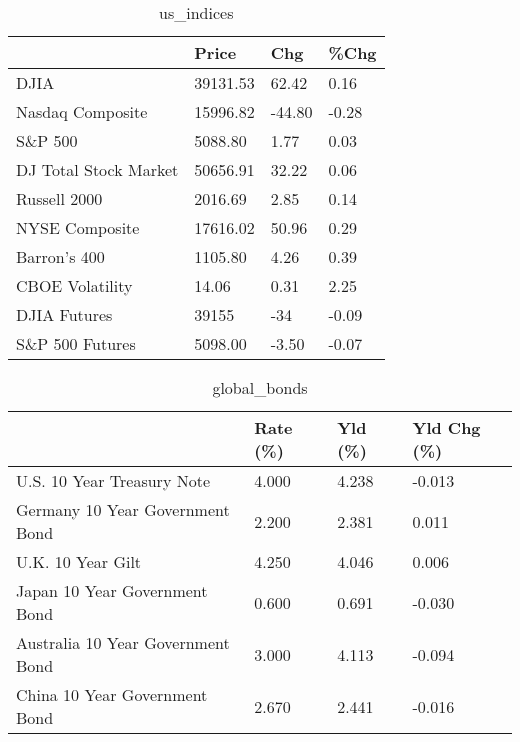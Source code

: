 \documentclass{article}%
\begin{document}
%


\begin{table}[htbp]%
\caption{us\_indices}%
\centering%
\begin{adjustbox}{width=1\textwidth}%
\begin{tabular}{llll}
\toprule
                      &    Price &    Chg &  \%Chg \\
\midrule
                 DJIA & 39131.53 &  62.42 &  0.16 \\
     Nasdaq Composite & 15996.82 & -44.80 & -0.28 \\
              S\&P 500 &  5088.80 &   1.77 &  0.03 \\
DJ Total Stock Market & 50656.91 &  32.22 &  0.06 \\
         Russell 2000 &  2016.69 &   2.85 &  0.14 \\
       NYSE Composite & 17616.02 &  50.96 &  0.29 \\
         Barron's 400 &  1105.80 &   4.26 &  0.39 \\
      CBOE Volatility &    14.06 &   0.31 &  2.25 \\
         DJIA Futures &    39155 &    -34 & -0.09 \\
      S\&P 500 Futures &  5098.00 &  -3.50 & -0.07 \\
\bottomrule
\end{tabular}
%
\end{adjustbox}%
\end{table}

%


\begin{table}[htbp]%
\caption{global\_bonds}%
\centering%
\begin{adjustbox}{width=1\textwidth}%
\begin{tabular}{llll}
\toprule
                                  & Rate (\%) & Yld (\%) & Yld Chg (\%) \\
\midrule
       U.S. 10 Year Treasury Note &    4.000 &   4.238 &      -0.013 \\
  Germany 10 Year Government Bond &    2.200 &   2.381 &       0.011 \\
                U.K. 10 Year Gilt &    4.250 &   4.046 &       0.006 \\
    Japan 10 Year Government Bond &    0.600 &   0.691 &      -0.030 \\
Australia 10 Year Government Bond &    3.000 &   4.113 &      -0.094 \\
    China 10 Year Government Bond &    2.670 &   2.441 &      -0.016 \\
\bottomrule
\end{tabular}
%
\end{adjustbox}%
\end{table}
\end{document}
